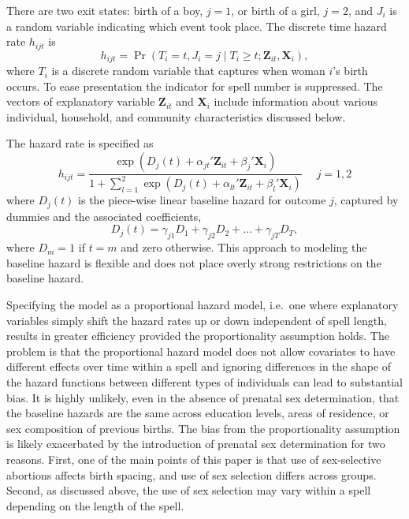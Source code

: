 \documentclass[12pt,letterpaper]{article}
\begin{document}
There are two exit states: birth of a boy, $j=1$, or birth of a girl, $j=2$, and 
$J_i$ is a random variable indicating which event took place.
The discrete time hazard rate $h_{ijt}$ is
\begin{equation}
 h_{ijt} = \Pr (T_i=t, J_i=j \mid T_i \geq t; \mathbf{Z}_{it},\mathbf{X}_{i} ),
\end{equation}
where $T_i$ is a discrete random variable that captures when woman $i$'s birth occurs.
To ease presentation the indicator for spell number is suppressed.
The vectors of explanatory variable $\mathbf{Z}_{it}$ and $\mathbf{X}_{i}$ include 
information about various individual, household, and community characteristics 
discussed below.

The hazard rate is specified as
\begin{equation}
 h_{ijt} = \frac{\exp(D_j(t) + \alpha_{jt}'\mathbf{Z}_{it} + \beta_j'\mathbf{X}_{i})} 
 {1 + \sum_{l=1}^2 \exp(D_j(t) + \alpha_{lt}'\mathbf{Z}_{it} + \beta_l'\mathbf{X}_{i})} \: \: \; \; \;  j = 1,2
 \label{eq:hazard}
\end{equation}
where $D_{j}(t)$ is the piece-wise linear baseline hazard for outcome $j$, captured
by dummies and the associated coefficients,
\begin{equation}
D_j(t) = \gamma_{j1} D_1 + \gamma_{j2} D_2 + \ldots + \gamma_{jT} D_T,
\end{equation}
where $D_m = 1$ if $t=m$ and zero otherwise.
This approach to modeling the baseline hazard is flexible and does not place overly strong 
restrictions on the baseline hazard.

Specifying the model as a proportional hazard model, i.e.\ one where explanatory variables 
simply shift the hazard rates up or down independent of spell length, results in 
greater efficiency provided the proportionality assumption holds.
The problem is that the proportional hazard model does not allow covariates
to have different effects over time within a spell and ignoring differences in the shape 
of the hazard functions between different types of individuals can lead to substantial bias.
It is highly unlikely, even in the absence of prenatal sex determination, that the 
baseline hazards are the same across education levels, areas of residence, or sex 
composition of previous births.
The bias from the proportionality assumption is likely exacerbated by the 
introduction of prenatal sex determination for two reasons.
First, one of the main points of this paper is that use of sex-selective abortions 
affects birth spacing, and use of sex selection differs across groups.
Second, as discussed above, the use of sex selection may vary within a spell depending
on the length of the spell.
\end{document}
